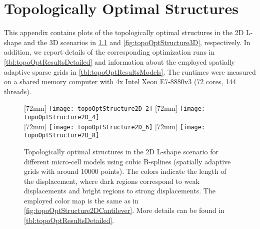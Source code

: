 \chapter{Topologically Optimal Structures}
\label{chap:a30structures}

\noindent
This appendix contains plots of the topologically optimal structures
in the 2D L-shape and the 3D scenarios in
\cref{fig:topoOptStructure2DLShape} and \cref{fig:topoOptStructure3D},
respectively.
In addition, we report details of the corresponding optimization runs
in \cref{tbl:topoOptResultsDetailed} and
information about the employed spatially adaptive sparse grids in
\cref{tbl:topoOptResultsModels}.
The runtimes were measured on a shared memory computer
with 4x Intel Xeon E7-8880v3 (72 cores, 144 threads).

\begin{figure}
  [72mm]{%
    \texttt{[image: topoOptStructure2D\_2]}%
  }%
  \hfill%
  [72mm]{%
    \texttt{[image: topoOptStructure2D\_4]}%
  }%
  \\[2mm]%
  [72mm]{%
    \texttt{[image: topoOptStructure2D\_6]}%
  }%
  \hfill%
  [72mm]{%
    \texttt{[image: topoOptStructure2D\_8]}%
  }%
  \caption[Optimal structures in the 2D L-shape scenario]{%
    Topologically optimal structures in the 2D L-shape scenario
    for different micro-cell models using cubic B-splines
    (spatially adaptive grids with around \num{10000} points).
    The colors indicate the length of the displacement,
    where dark regions correspond to weak displacements and
    bright regions to strong displacements.
    The employed color map is the same as in
    \cref{fig:topoOptStructure2DCantilever}.
    More details can be found in \cref{tbl:topoOptResultsDetailed}.%
  }%
  \label{fig:topoOptStructure2DLShape}%
\end{figure}

